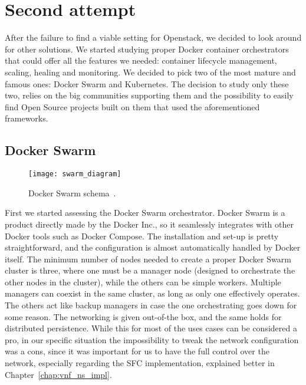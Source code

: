 \section{Second attempt}

After the failure to find a viable setting for Openstack, we decided to look
around for other solutions. We started studying proper Docker container
orchestrators that could offer all the features we needed: container lifecycle
management, scaling, healing and monitoring. We decided to pick two of the most
mature and famous ones: Docker Swarm and Kubernetes. The decision to study only
these two, relies on the big communities supporting them and the possibility to
easily find Open Source projects built on them that used the aforementioned
frameworks.

\subsection{Docker Swarm}

\begin{figure}[t]
  \centering
  \texttt{[image: swarm\_diagram]}
  \caption[Docker Swarm schema]{Docker Swarm schema~\cite{dockerSwarmWiki}.}
  \label{chap:archimpl:sec:secondattempt:img:dockerswarm}
\end{figure}

First we started assessing the Docker Swarm orchestrator. Docker Swarm is a
product directly made by the Docker Inc., so it seamlessly integrates with other
Docker tools such as Docker Compose. The installation and set-up is pretty
straightforward, and the configuration is almost automatically handled by Docker
itself. The minimum number of nodes needed to create a proper Docker Swarm
cluster is three, where one must be a manager node (designed to orchestrate the
other nodes in the cluster), while the others can be simple workers. Multiple
managers can coexist in the same cluster, as long as only one effectively
operates. The others act like backup managers in case the one orchestrating goes
down for some reason. The networking is given out-of-the box, and the same holds
for distributed persistence. While this for most of the uses cases can be
considered a pro, in our specific situation the impossibility to tweak the
network configuration was a cons, since it was important for us to have the full
control over the network, especially regarding the SFC implementation, explained
better in Chapter~\ref{chap:vnf_ns_impl}.

